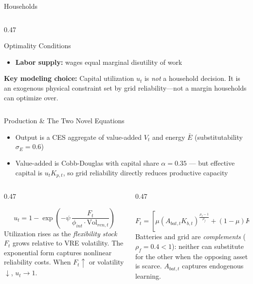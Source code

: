 \documentclass[aspectratio=169,10pt]{beamer}
\newcommand{\fuvhl}[1]{\textcolor{fuvteal}{\textbf{#1}}}
\begin{document}
\begin{frame}{Households}
\begin{columns}[T]
\begin{column}{0.47\textwidth}
\begin{block}{Optimality Conditions}
\begin{itemize}
          \item \textbf{Labor supply:} wages equal marginal disutility of work
        \end{itemize}
      \end{block}
      \vspace{0.4em}
      \begin{keybox}
        \small \textbf{Key modeling choice:} Capital utilization $u_t$ is \textit{not} a household decision. It is an exogenous physical constraint set by grid reliability---not a margin households can optimize over.
      \end{keybox}
    \end{column}
  \end{columns}
\end{frame}

\begin{frame}{Production \& The Two Novel Equations}
  \begin{itemize}\small
    \item Output is a CES aggregate of value-added $V_t$ and energy $\bar{E}$ (substitutability $\sigma_E = 0.6$)
    \item Value-added is Cobb-Douglas with capital share $\alpha = 0.35$ --- but effective capital is \fuvhl{$u_t K_{p,t}$}, so grid reliability directly reduces productive capacity
  \end{itemize}
  \vspace{0.3em}
  \begin{columns}[T]
    \begin{column}{0.47\textwidth}
      \begin{alertbox}[title=\textbf{Contribution 1} --- Reliability Constraint]
        \[
          u_t = 1 - \exp\!\left(-\psi\,\frac{F_t}{\phi_{int}\cdot\mathrm{Vol}_{ren,t}}\right)
        \]
        \small Utilization rises as the \textit{flexibility stock} $F_t$ grows relative to VRE volatility. The exponential form captures nonlinear reliability costs. When $F_t \uparrow$ or volatility $\downarrow$, $u_t \to 1$.
      \end{alertbox}
    \end{column}
    \begin{column}{0.47\textwidth}
      \begin{keybox}[title=\textbf{Contribution 2} --- CES Flexibility Bundle]
        \[
          F_t = \!\left[\mu(A_{bat,t}K_{b,t})^{\frac{\rho_f-1}{\rho_f}}
          +(1{-}\mu)K_{g,t}^{\frac{\rho_f-1}{\rho_f}}\right]^{\frac{\rho_f}{\rho_f-1}}
        \]
        \small Batteries and grid are \textit{complements} ($\rho_f=0.4 < 1$): neither can substitute for the other when the opposing asset is scarce. $A_{bat,t}$ captures endogenous learning.
      \end{keybox}
    \end{column}
  \end{columns}
\end{frame}
\end{document}
